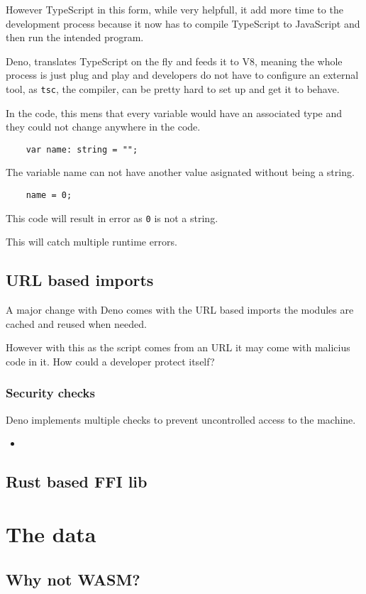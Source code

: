 \documentclass[12pt, letterpaper]{article}
\begin{document}
\begin{multicols}{2}
    However TypeScript in this form, while very helpfull, it add more time to the development process because it now has to compile TypeScript to JavaScript and then run the intended program.

    Deno, translates TypeScript on the fly and feeds it to V8, meaning the whole process is just plug and play and developers do not have to configure an external tool, as \verb|tsc|, the compiler, can be pretty hard to set up and get it to behave.

    In the code, this mens that every variable would have an associated type and they could not change anywhere in the code.

    \begin{lstlisting}
    var name: string = "";
    \end{lstlisting}

    The variable name can not have another value asignated without being a string.

    \begin{lstlisting}
    name = 0;
    \end{lstlisting}

    This code will result in error as \verb|0| is not a string.

    This will catch multiple runtime errors.

    \subsection{URL based imports}

    A major change with Deno comes with the URL based imports the modules are cached and reused when needed.

    However with this as the script comes from an URL it may come with malicius code in it. How could a developer protect itself?

    \subsubsection{Security checks}

    Deno implements multiple checks to prevent uncontrolled access to the machine.

    \begin{itemize}
        \item 
    \end{itemize}


    \subsection{Rust based FFI lib}
    \section{The data}
    \subsection{Why not WASM?}
\end{multicols}
\end{document}
